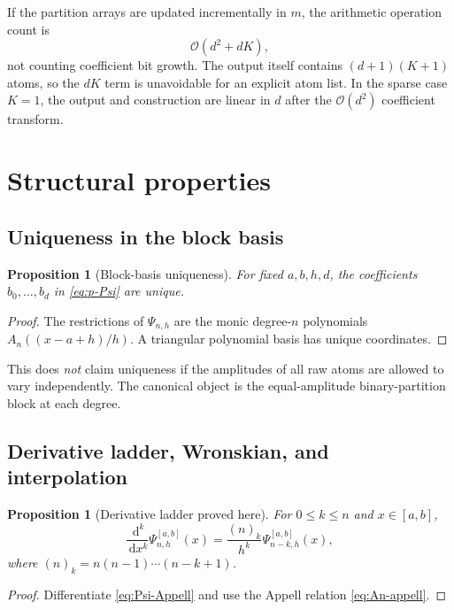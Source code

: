 \documentclass[11pt]{article}
\newtheorem{proposition}[theorem]{Proposition}
\theoremstyle{definition}
\theoremstyle{remark}
\newcommand{\1}{\mathbf{1}}
\newcommand{\dd}{\,\mathrm{d}}
\newcommand{\BigO}{\mathcal{O}}
\newcommand{\ProvedHere}{\textcolor{BrickRed}{\textsf{proved here}}}
\begin{document}
If the partition arrays are updated incrementally in $m$, the arithmetic
operation count is
\begin{equation}
 \BigO(d^2+dK),
 \label{eq:complexity}
\end{equation}
not counting coefficient bit growth.  The output itself contains
$(d+1)(K+1)$ atoms, so the $dK$ term is unavoidable for an explicit atom list.
In the sparse case $K=1$, the output and construction are linear in $d$ after
the $\BigO(d^2)$ coefficient transform.

\section{Structural properties}

\subsection{Uniqueness in the block basis}

\begin{proposition}[Block-basis uniqueness]
For fixed $a,b,h,d$, the coefficients $b_0,\ldots,b_d$ in
\eqref{eq:p-Psi} are unique.
\end{proposition}

\begin{proof}
The restrictions of $\Psi_{n,h}$ are the monic degree-$n$ polynomials
$A_n((x-a+h)/h)$.  A triangular polynomial basis has unique coordinates.
\end{proof}

This does \emph{not} claim uniqueness if the amplitudes of all raw atoms are
allowed to vary independently.  The canonical object is the equal-amplitude
binary-partition block at each degree.

\subsection{Derivative ladder, Wronskian, and interpolation}

\begin{proposition}[Derivative ladder \ProvedHere]
For $0\leq k\leq n$ and $x\in[a,b]$,
\begin{equation}
 \frac{\dd^k}{\dd x^k}\Psi_{n,h}^{[a,b]}(x)
 =\frac{(n)_k}{h^k}\Psi_{n-k,h}^{[a,b]}(x),
 \label{eq:derivative-ladder}
\end{equation}
where $(n)_k=n(n-1)\cdots(n-k+1)$.
\end{proposition}

\begin{proof}
Differentiate \eqref{eq:Psi-Appell} and use the Appell relation
\eqref{eq:An-appell}.
\end{proof}
\end{document}
